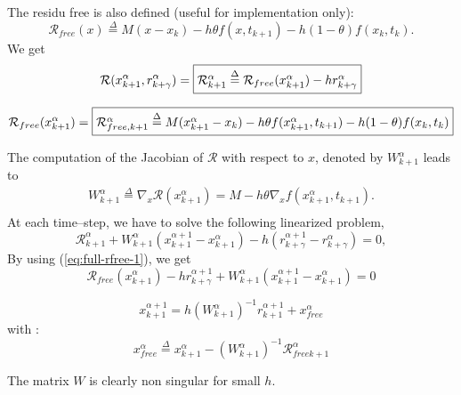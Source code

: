The residu free is also defined (useful for implementation only):
\[\mathcal R _{free}(x) \stackrel{\Delta}{=}  M(x - x_{k}) -h\theta f( x , t_{k+1}) - h(1-\theta)f(x_k,t_k).\]
We get
\begin{equation}
  \mathcal R (x^{\alpha}_{k+1},r^{\alpha}_{k+\gamma}) = \fbox{$\mathcal R^{\alpha}_{k+1} \stackrel{\Delta}{=}  \mathcal R_{free}(x^{\alpha}_{k+1} )  - h r^{\alpha}_{k+\gamma}$}\label{eq:full-rfree-1}
\end{equation}

\[  \mathcal R
_{free}(x^{\alpha}_{k+1} )=\fbox{$ \mathcal R _{free, k+1} ^{\alpha} \stackrel{\Delta}{=}  M(x^{\alpha}_{k+1} - x_{k}) -h\theta f( x^{\alpha}_{k+1} , t_{k+1}) - h(1-\theta)f(x_k,t_k)$}\]
 
The computation of the Jacobian of $\mathcal R$ with respect to $x$, denoted by $   W^{\alpha}_{k+1}$ leads to 
\begin{equation}
   \label{eq:full-NL9}
   \begin{array}{l}
    W^{\alpha}_{k+1} \stackrel{\Delta}{=} \nabla_{x} \mathcal R (x^{\alpha}_{k+1})= M - h  \theta \nabla_{x} f(  x^{\alpha}_{k+1}, t_{k+1} ).\\
 \end{array}
\end{equation}
At each time--step, we have to solve the following linearized problem,
\begin{equation}
   \label{eq:full-NL10}
    \mathcal R^{\alpha}_{k+1} + W^{\alpha}_{k+1} (x^{\alpha+1}_{k+1} -
    x^{\alpha}_{k+1}) - h  (r^{\alpha+1}_{k+\gamma} - r^{\alpha}_{k+\gamma} )  =0 ,
\end{equation}
By using (\ref{eq:full-rfree-1}), we get
\begin{equation}
  \label{eq:full-rfree-2}
  \mathcal R _{free}(x^{\alpha}_{k+1})  - h  r^{\alpha+1}_{k+\gamma}   + W^{\alpha}_{k+1} (x^{\alpha+1}_{k+1} -
    x^{\alpha}_{k+1})  =0 
\end{equation}

{
  \begin{equation}
    \boxed{ x^{\alpha+1}_{k+1} = h(W^{\alpha}_{k+1})^{-1}r^{\alpha+1}_{k+1} +x^\alpha_{free}}
  \end{equation}
}
with :
\begin{equation}
  \boxed{x^\alpha_{free}\stackrel{\Delta}{=}x^{\alpha}_{k+1}-(W^{\alpha}_{k+1})^{-1}\mathcal R_{freek+1}^{\alpha} \label{eq:full-rfree-12}}
\end{equation}

The matrix $W$ is clearly non singular for small $h$.


